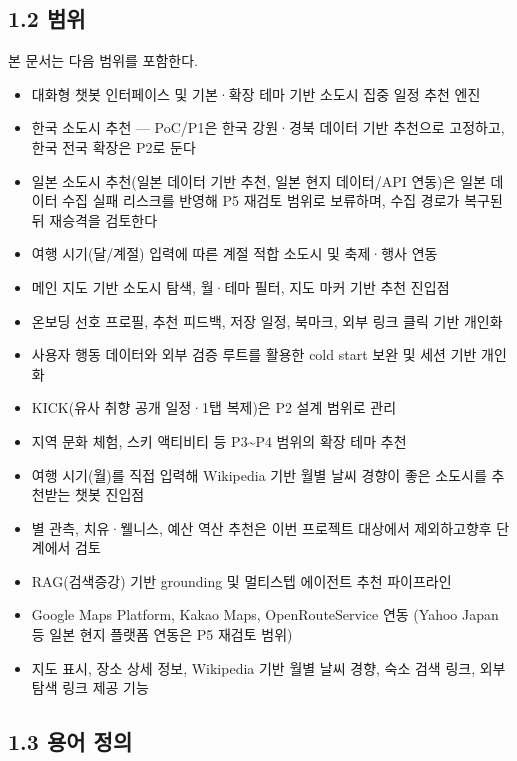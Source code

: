 \documentclass[12pt,a4paper]{article}
\newcommand{\DocNeedspace}[1]{\par\ifdim\dimexpr\pagegoal-\pagetotal\relax<#1\newpage\fi}
\begin{document}
\DocNeedspace{24\baselineskip}
\subsection*{1.2 범위}


\DocNeedspace{3\baselineskip}
본 문서는 다음 범위를 포함한다.


\begin{itemize}
\item 대화형 챗봇 인터페이스 및 기본·확장 테마 기반 소도시 집중 일정 추천 엔진
\item 한국 소도시 추천 --- PoC/P1은 한국 강원·경북 데이터 기반 추천으로 고정하고, 한국 전국 확장은 P2로 둔다
\item 일본 소도시 추천(일본 데이터 기반 추천, 일본 현지 데이터/API 연동)은 일본 데이터 수집 실패 리스크를 반영해 P5 재검토 범위로 보류하며, 수집 경로가 복구된 뒤 재승격을 검토한다
\item 여행 시기(달/계절) 입력에 따른 계절 적합 소도시 및 축제·행사 연동
\item 메인 지도 기반 소도시 탐색, 월·테마 필터, 지도 마커 기반 추천 진입점
\item 온보딩 선호 프로필, 추천 피드백, 저장 일정, 북마크, 외부 링크 클릭 기반 개인화
\item 사용자 행동 데이터와 외부 검증 루트를 활용한 cold start 보완 및 세션 기반 개인화
\item KICK(유사 취향 공개 일정·1탭 복제)은 P2 설계 범위로 관리
\item 지역 문화 체험, 스키 액티비티 등 P3\textasciitilde{}P4 범위의 확장 테마 추천
\item 여행 시기(월)를 직접 입력해 Wikipedia 기반 월별 날씨 경향이 좋은 소도시를 추천받는 챗봇 진입점
\item 별 관측, 치유·웰니스, 예산 역산 추천은 이번 프로젝트 대상에서 제외하고\newline 향후 단계에서 검토
\item RAG(검색증강) 기반 grounding 및 멀티스텝 에이전트 추천 파이프라인
\item Google Maps Platform, Kakao Maps, OpenRouteService 연동 (Yahoo Japan 등 일본 현지 플랫폼 연동은 P5 재검토 범위)
\item 지도 표시, 장소 상세 정보, Wikipedia 기반 월별 날씨 경향, 숙소 검색 링크, 외부 탐색 링크 제공 기능
\end{itemize}


\DocNeedspace{24\baselineskip}
\subsection*{1.3 용어 정의}
\end{document}
